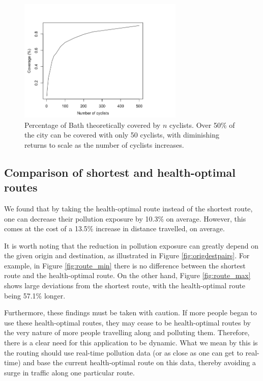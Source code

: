 \documentclass[11pt]{report}
\begin{document}
\begin{figure}[!tb]
\centering
\includegraphics[width=0.7\textwidth]{images/coverage}
\caption[Cyclist coverage.]{Percentage of Bath theoretically covered by $n$ cyclists. Over 50\% of the city can be covered with only 50 cyclists, with diminishing returns to scale as the number of cyclists increases.}
\label{fig:coverage}
\end{figure}


\subsection{Comparison of shortest and health-optimal routes}

We found that by taking the health-optimal route instead of the shortest route, one can decrease their pollution exposure by 10.3\% on average. However, this comes at the cost of a 13.5\% increase in distance travelled, on average.


It is worth noting that the reduction in pollution exposure can greatly depend on the given origin and destination, as illustrated in Figure \ref{fig:origdestpairs}. For example, in Figure \ref{fig:route_min} there is no difference between the shortest route and the health-optimal route. On the other hand, Figure \ref{fig:route_max} shows large deviations from the shortest route, with the health-optimal route being 57.1\% longer.

Furthermore, these findings must be taken with caution. If more people began to use these health-optimal routes, they may cease to be health-optimal routes by the very nature of more people travelling along and polluting them. Therefore, there is a clear need for this application to be dynamic. What we mean by this is the routing should use real-time pollution data (or as close as one can get to real-time) and base the current health-optimal route on this data, thereby avoiding a surge in traffic along one particular route.
\end{document}
